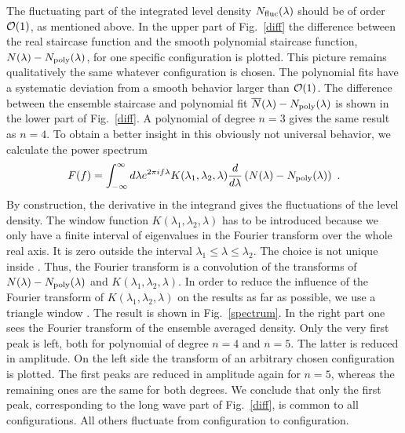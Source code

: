 The fluctuating part of the integrated level density $N_{\rm
  fluc}(\lambda)$ should be of order ${\cal O}(1)$, as mentioned
above.  In the upper part of Fig.~\ref{diff} the difference between the
real staircase function and the smooth polynomial staircase function,
$N(\lambda)-N_{\rm poly}(\lambda)$, for one specific configuration is
plotted. This picture remains qualitatively the same whatever
configuration is chosen.  The polynomial fits have a systematic
deviation from a smooth behavior larger than ${\cal O}(1)$. The
difference between the ensemble staircase and polynomial fit
$\overline{N}(\lambda)-N_{\rm poly}(\lambda)$ is shown in the lower
part of Fig.~\ref{diff}.  A polynomial of degree $n=3$ gives the same
result as $n=4$.  To obtain a better insight in this obviously not
universal behavior, we calculate the power spectrum
\begin{equation}
  F(f)=\int^{\infty}_{-\infty} d\lambda e^{2\pi if\lambda}
  K(\lambda_1,\lambda_2,\lambda)
  \frac{d}{d\lambda}\left(N(\lambda)-N_{\rm poly}(\lambda)\right) \ .
\label{transf}
\end{equation}
By construction, the derivative in the integrand gives the
fluctuations of the level density.  The window function
$K(\lambda_1,\lambda_2,\lambda)$ has to be introduced because we only
have a finite interval of eigenvalues in the Fourier transform over
the whole real axis. It is zero outside the interval
$\lambda_1\leq\lambda\leq\lambda_2$. The choice is not unique inside
\cite{nr}.  Thus, the Fourier transform is a convolution of the
transforms of $N(\lambda)-N_{\rm poly}(\lambda)$ and
$K(\lambda_1,\lambda_2,\lambda)$.  In order to reduce the influence of
the Fourier transform of $K(\lambda_1,\lambda_2,\lambda)$ on the
results as far as possible, we use a triangle window \cite{nr}.  The
result is shown in Fig.~\ref{spectrum}. In the right part one sees the
Fourier transform of the ensemble averaged density. Only the very
first peak is left, both for polynomial of degree $n=4$ and $n=5$.
The latter is reduced in amplitude. On the left side the transform of
an arbitrary chosen configuration is plotted. The first peaks are
reduced in amplitude again for $n=5$, whereas the remaining ones are
the same for both degrees.  We conclude that only the first peak,
corresponding to the long wave part of Fig.~\ref{diff}, is common to
all configurations. All others fluctuate from configuration to
configuration.

